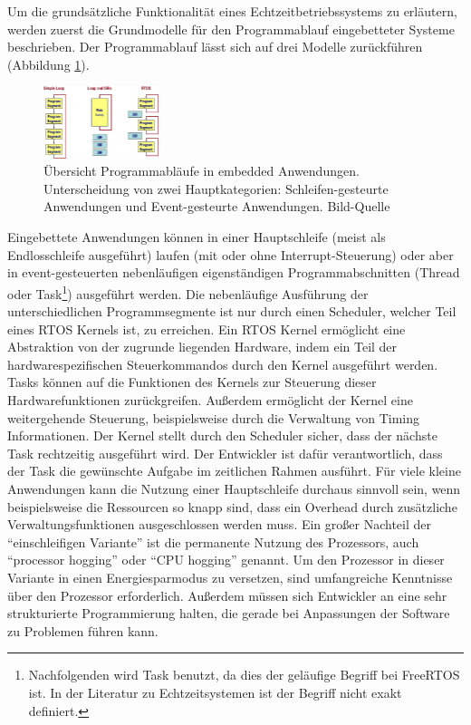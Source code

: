 Um die grund\-sätz\-liche Funktionalität eines Echtzeitbetriebssystems zu erläutern, werden zuerst die Grundmodelle für den Programmablauf eingebetteter Systeme beschrieben. Der Programmablauf lässt sich auf drei Modelle zu\-rück\-füh\-ren (Abbildung \ref{fig:Programmablauf}). 
\begin{figure}[ht]
	\centering
		\includegraphics[width=0.3\textwidth]{Pictures/EmbeddedCom/cwrtos2f5c.jpg}
	\caption{Übersicht Programmabläufe in embedded Anwendungen. Unterscheidung von zwei Hauptkategorien: Schleifen-gesteurte Anwendungen und Event-gesteurte Anwendungen. Bild-Quelle~\protect{}}
	\label{fig:Programmablauf}
\end{figure}
Eingebettete Anwendungen können in einer Hauptschleife (meist als Endlosschleife ausgeführt) laufen  (mit oder ohne Interrupt-Steuerung) oder aber in event-gesteuerten ne\-ben\-läuf\-igen ei\-gen\-stän\-dig\-en Pro\-gramm\-ab\-schnit\-ten (Thre\-ad oder Task\footnote{Nachfolgenden wird Task benutzt, da dies der geläufige Begriff bei FreeRTOS ist. In der Literatur zu Echtzeitsystemen ist der Begriff nicht exakt definiert.}) ausgeführt werden. Die ne\-ben\-läuf\-ige Aus\-füh\-rung der unterschiedlichen Programmsegmente ist nur durch einen Scheduler, welcher Teil eines RTOS Kernels ist, zu erreichen. Ein RTOS Kernel ermöglicht eine Abstraktion von der zugrunde liegenden Hardware, indem ein Teil der hardwarespezifischen Steuerkommandos durch den Kernel ausgeführt werden. Tasks können auf die Funktionen des Kernels zur Steuerung dieser Hardwarefunktionen zurückgreifen. Außerdem ermöglicht der Kernel eine weitergehende Steuerung, beispielsweise durch die Verwaltung von Timing Informationen. Der Kernel stellt durch den Scheduler sicher, dass der näch\-ste Task rechtzeitig ausgeführt wird. Der Entwickler ist dafür verantwortlich, dass der Task die ge\-wün\-schte Aufgabe im zeitlichen Rahmen ausführt. 
Für viele kleine Anwendungen kann die Nutzung einer Hauptschleife durchaus sinnvoll sein, wenn beispielsweise die Ressourcen so knapp sind, dass ein Overhead durch zusätzliche Verwaltungsfunktionen ausgeschlossen werden muss. Ein großer Nachteil der "`einschleifigen Variante"' ist die permanente Nutzung des Prozessors, auch "`processor hogging"' oder "`CPU hogging"' genannt. Um den Prozessor in dieser Variante in einen Energiesparmodus zu versetzen, sind umfangreiche Kenntnisse über den Prozessor erforderlich. Außerdem müssen sich Entwickler an eine sehr strukturierte Programmierung halten, die gerade bei Anpassungen der Software zu Problemen führen kann. 
